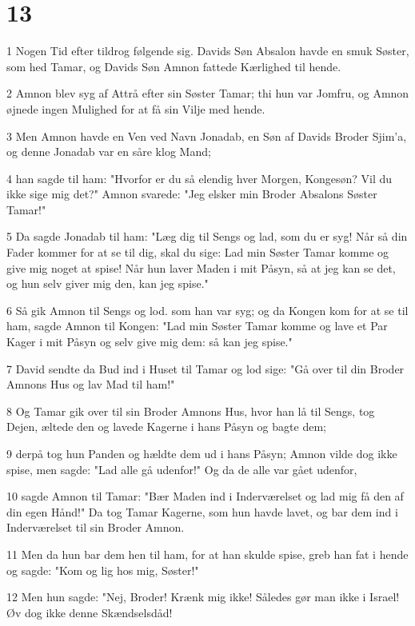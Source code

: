 \chapter{13}

\par 1 Nogen Tid efter tildrog følgende sig. Davids Søn Absalon havde en smuk Søster, som hed Tamar, og Davids Søn Amnon fattede Kærlighed til hende.
\par 2 Amnon blev syg af Attrå efter sin Søster Tamar; thi hun var Jomfru, og Amnon øjnede ingen Mulighed for at få sin Vilje med hende.
\par 3 Men Amnon havde en Ven ved Navn Jonadab, en Søn af Davids Broder Sjim'a, og denne Jonadab var en såre klog Mand;
\par 4 han sagde til ham: "Hvorfor er du så elendig hver Morgen, Kongesøn? Vil du ikke sige mig det?" Amnon svarede: "Jeg elsker min Broder Absalons Søster Tamar!"
\par 5 Da sagde Jonadab til ham: "Læg dig til Sengs og lad, som du er syg! Når så din Fader kommer for at se til dig, skal du sige: Lad min Søster Tamar komme og give mig noget at spise! Når hun laver Maden i mit Påsyn, så at jeg kan se det, og hun selv giver mig den, kan jeg spise."
\par 6 Så gik Amnon til Sengs og lod. som han var syg; og da Kongen kom for at se til ham, sagde Amnon til Kongen: "Lad min Søster Tamar komme og lave et Par Kager i mit Påsyn og selv give mig dem: så kan jeg spise."
\par 7 David sendte da Bud ind i Huset til Tamar og lod sige: "Gå over til din Broder Amnons Hus og lav Mad til ham!"
\par 8 Og Tamar gik over til sin Broder Amnons Hus, hvor han lå til Sengs, tog Dejen, æltede den og lavede Kagerne i hans Påsyn og bagte dem;
\par 9 derpå tog hun Panden og hældte dem ud i hans Påsyn; Amnon vilde dog ikke spise, men sagde: "Lad alle gå udenfor!" Og da de alle var gået udenfor,
\par 10 sagde Amnon til Tamar: "Bær Maden ind i Inderværelset og lad mig få den af din egen Hånd!" Da tog Tamar Kagerne, som hun havde lavet, og bar dem ind i Inderværelset til sin Broder Amnon.
\par 11 Men da hun bar dem hen til ham, for at han skulde spise, greb han fat i hende og sagde: "Kom og lig hos mig, Søster!"
\par 12 Men hun sagde: "Nej, Broder! Krænk mig ikke! Således gør man ikke i Israel! Øv dog ikke denne Skændselsdåd!
